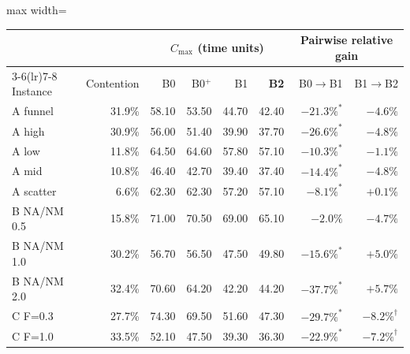 \begin{adjustbox}{max width=\linewidth}\begin{tabular}{@{}lrrrrrrr@{}}
\toprule
& & \multicolumn{4}{c}{$C_{\max}$ (time units)} & \multicolumn{2}{c}{Pairwise relative gain} \\
\cmidrule(lr){3-6}\cmidrule(lr){7-8}
Instance & Contention & B0 & B0$^{+}$ & B1 & \textbf{B2} & B0$\rightarrow$B1 & B1$\rightarrow$B2 \\
\midrule
A funnel & 31.9\% & 58.10 & 53.50 & 44.70 & 42.40 & $-21.3\%^{*}$ & $-4.6\%$ \\
A high & 30.9\% & 56.00 & 51.40 & 39.90 & 37.70 & $-26.6\%^{*}$ & $-4.8\%$ \\
A low & 11.8\% & 64.50 & 64.60 & 57.80 & 57.10 & $-10.3\%^{*}$ & $-1.1\%$ \\
A mid & 10.8\% & 46.40 & 42.70 & 39.40 & 37.40 & $-14.4\%^{*}$ & $-4.8\%$ \\
A scatter & 6.6\% & 62.30 & 62.30 & 57.20 & 57.10 & $-8.1\%^{*}$ & $+0.1\%$ \\
\midrule
B NA/NM 0.5 & 15.8\% & 71.00 & 70.50 & 69.00 & 65.10 & $-2.0\%$ & $-4.7\%$ \\
B NA/NM 1.0 & 30.2\% & 56.70 & 56.50 & 47.50 & 49.80 & $-15.6\%^{*}$ & $+5.0\%$ \\
B NA/NM 2.0 & 32.4\% & 70.60 & 64.20 & 42.20 & 44.20 & $-37.7\%^{*}$ & $+5.7\%$ \\
\midrule
C F=0.3 & 27.7\% & 74.30 & 69.50 & 51.60 & 47.30 & $-29.7\%^{*}$ & $-8.2\%^{\dagger}$ \\
C F=1.0 & 33.5\% & 52.10 & 47.50 & 39.30 & 36.30 & $-22.9\%^{*}$ & $-7.2\%^{\dagger}$ \\
\bottomrule
\end{tabular}\end{adjustbox}
